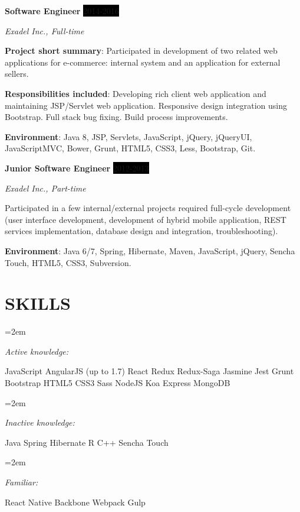 \documentclass[paper=a4,fontsize=11pt]{scrartcl} %
\newlength{\spacebox}
\newcommand{\sepspace}{\vspace*{1em}}		%
\newcommand{\NewPart}[1]{\section*{\uppercase{#1}}}
\newcommand{\PersonalEntry}[2]{
		\noindent\hangindent=2em\hangafter=0 %
		\parbox{\spacebox}{        %
		\textit{#1}}		       %
		\hspace{1.5em} #2 \par}    %
\newcommand{\SkillsEntry}[2]{      %
		\noindent\hangindent=2em\hangafter=0 %
		\parbox{9em}{\textit{#1}}			   %
		\parbox{25em}{ \small #2 \normalsize \par} }
\newcommand{\EducationEntry}[4]{
		\noindent \textbf{#1} \hfill      %
		\colorbox{Black}{%
			\parbox{6em}{%
			\hfill\color{White}#2}} \par  %
		\noindent \textit{#3} \par        %
			\noindent\hangindent=2em\hangafter=0 \small #4 %
		\normalsize \par}
\newcommand{\WorkEntry}[4]{				  %
			\noindent \textbf{#1} \hfill      %
		\colorbox{Black}{\color{White}#2} \par  %
		\noindent \textit{#3} \par              %
		\hangafter=0 \small #4 %
		\normalsize \par}
\begin{document}
\WorkEntry{Software Engineer}{2014-2016}{Exadel Inc., Full-time}{
\textbf{Project short summary}: Participated in development of two related web applications for e-commerce: internal system and an application for external sellers.

\textbf{Responsibilities included}: Developing rich client web application and maintaining JSP/Servlet web application. Responsive design integration using Bootstrap. Full stack bug fixing. Build process improvements.

\textbf{Environment}: Java 8, JSP, Servlets, JavaScript, jQuery, jQueryUI, JavaScriptMVC, Bower, Grunt, HTML5, CSS3, Less, Bootstrap, Git.}
\sepspace

\pagebreak

\WorkEntry{Junior Software Engineer}{2012-2013}{Exadel Inc., Part-time}{Participated in a few internal/external projects required full-cycle development (user interface development, development of hybrid mobile application, REST services implementation, database design and integration, troubleshooting).

\textbf{Environment}: Java 6/7, Spring, Hibernate, Maven, JavaScript, jQuery, Sencha Touch, HTML5, CSS3, Subversion.
}

\NewPart{Skills}{}

\SkillsEntry{Active knowledge:}{JavaScript \textbullet{} AngularJS (up to 1.7) \textbullet{} React \textbullet{} Redux \textbullet{} Redux-Saga \textbullet{} Jasmine \textbullet{} Jest \textbullet{} Grunt \textbullet{} Bootstrap \textbullet{} HTML5 \textbullet{} CSS3 \textbullet Sass \textbullet{} NodeJS \textbullet{} Koa \textbullet{} Express \textbullet{} MongoDB}

\sepspace

\SkillsEntry{Inactive knowledge:}{Java \textbullet{} Spring \textbullet{} Hibernate \textbullet{} R \textbullet{} C++ \textbullet{} Sencha Touch }

\sepspace

\SkillsEntry{Familiar:}{React Native \textbullet{} Backbone \textbullet{} Webpack \textbullet{} Gulp }
\end{document}
